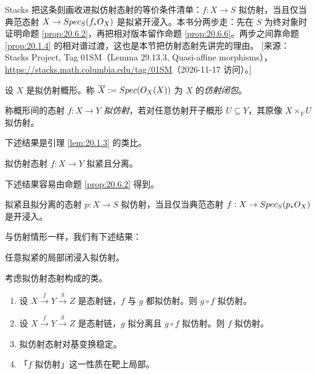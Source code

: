 \begin{yizhu}
Stacks 把这条刻画收进拟仿射态射的等价条件清单：$f:X\to S$ 拟仿射，当且仅当典范态射 $X\to Spec_S(f_*O_X)$ 是拟紧开浸入。本书分两步走：先在 $S$ 为终对象时证明命题 \ref{prop:20.6.2}，再把相对版本留作命题 \ref{prop:20.6.6}。两步之间靠命题 \ref{prop:20.1.4} 的相对谱过渡，这也是本节把仿射态射先讲完的理由。
[来源：Stacks Project, Tag 01SM（Lemma 29.13.3, Quasi-affine morphisms），\url{https://stacks.math.columbia.edu/tag/01SM}（2026-11-17 访问）。]
\end{yizhu}

\begin{definition}\label{def:20.6.3}
设 $X$ 是拟仿射概形。称 $\overline{X}:=Spec(O_X(X))$ 为 $X$ 的\emph{仿射闭包}。
\end{definition}

\begin{definition}\label{def:20.6.4}
称概形间的态射 $f:X\to Y$ \emph{拟仿射}，若对任意仿射开子概形 $U\subseteq Y$，其原像 $X\times_Y U$ 拟仿射。
\end{definition}

下述结果是引理 \ref{lem:20.1.3} 的类比。

\begin{lemma}\label{lem:20.6.5}
拟仿射态射 $f:X\to Y$ 拟紧且分离。
\end{lemma}

下述结果容易由命题 \ref{prop:20.6.2} 得到。

\begin{proposition}\label{prop:20.6.6}
拟紧且拟分离的态射 $p:X\to S$ 拟仿射，当且仅当典范态射 $f:X\to Spec_S(p_*O_X)$ 是开浸入。
\end{proposition}

与仿射情形一样，我们有下述结果：

\begin{lemma}\label{lem:20.6.7}
任意拟紧的局部闭浸入拟仿射。
\end{lemma}

\begin{lemma}\label{lem:20.6.8}
考虑拟仿射态射构成的类。
\begin{enumerate}[label=(\roman*),leftmargin=2em,itemsep=0.25ex]
  \item 设 $X\xrightarrow{f}Y\xrightarrow{g}Z$ 是态射链，$f$ 与 $g$ 都拟仿射。则 $g\circ f$ 拟仿射。
  \item 设 $X\xrightarrow{f}Y\xrightarrow{g}Z$ 是态射链，$g$ 拟分离且 $g\circ f$ 拟仿射。则 $f$ 拟仿射。
  \item 拟仿射态射对基变换稳定。
  \item 「$f$ 拟仿射」这一性质在靶上局部。
\end{enumerate}
\end{lemma}

